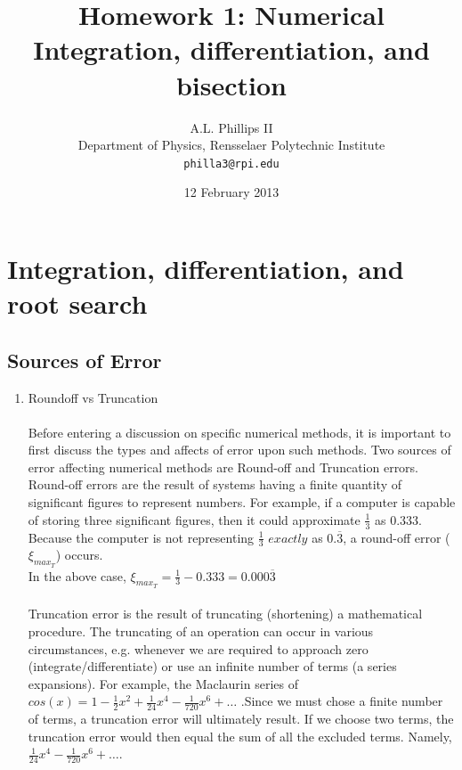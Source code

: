 \documentclass{report}
\begin{document}
\title{\textbf{Homework 1:} Numerical Integration, differentiation, and bisection}
\author{A.L. Phillips II\\
  Department of Physics,%
  Rensselaer Polytechnic Institute\\
  \texttt{philla3@rpi.edu}}
\date{12 February 2013}
\maketitle
\chapter{Integration, differentiation, and root search}

\section{Sources of Error}
\begin{enumerate}
\item Roundoff vs Truncation
\\
\\Before entering a discussion on specific numerical methods, it is important to first discuss the types and affects of error upon such methods. Two sources of error affecting numerical methods are Round-off and Truncation errors. Round-off errors are the result of systems having a finite quantity of significant figures to represent numbers. For example, if a computer is capable of storing three significant figures, then it could approximate $ \frac{1}{3}$ as $0.333$. Because the computer is not representing $ \frac{1}{3}$ $exactly$ as $0.\overline{3}$, a round-off error ($\xi_{max_{T}}$) occurs. 
\\In the above case, $\displaystyle \xi_{max_{T}} = \frac{1}{3} - 0.333 = 0.000\overline{3} $
\\
\\Truncation error is the result of truncating (shortening) a mathematical procedure. The truncating of an operation can occur in various circumstances, e.g. whenever we are required to approach zero (integrate/differentiate) or use an infinite number of terms (a series expansions). For example, the Maclaurin series of $cos(x) = 1 - \frac{1}{2}x^2 + \frac{1}{24}x^4 - \frac{1}{720}x^6 + \ldots$ .Since we must chose a finite number of terms, a truncation error will ultimately result. If we choose two terms, the truncation error would then equal the sum of all the excluded terms. Namely, $\frac{1}{24}x^4 - \frac{1}{720}x^6 + \ldots$.  
\\
\end{enumerate}
\end{document}
